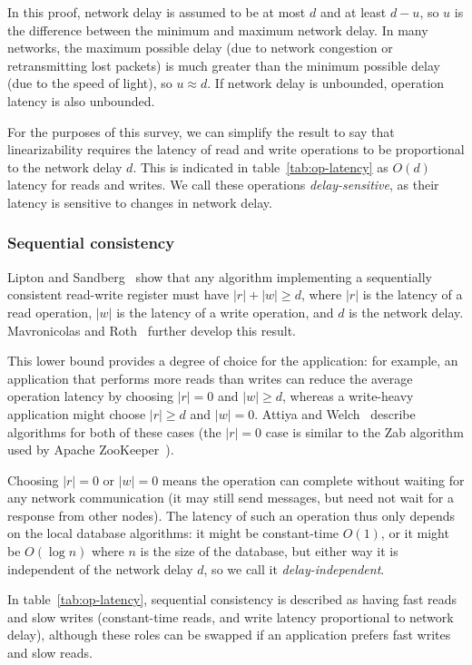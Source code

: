 \documentclass[a4paper,twocolumn,10pt]{article}
\begin{document}
In this proof, network delay is assumed to be at most $d$ and at least $d-u$, so $u$ is the
difference between the minimum and maximum network delay. In many networks, the maximum possible
delay (due to network congestion or retransmitting lost packets) is much greater than the minimum
possible delay (due to the speed of light), so $u \approx d$. If network delay is unbounded,
operation latency is also unbounded.

For the purposes of this survey, we can simplify the result to say that linearizability requires the
latency of read and write operations to be proportional to the network delay $d$. This is indicated
in table~\ref{tab:op-latency} as $O(d)$ latency for reads and writes. We call these operations
\emph{delay-sensitive}, as their latency is sensitive to changes in network delay.

\subsubsection{Sequential consistency}

Lipton and Sandberg~\cite{Lipton1988uh} show that any algorithm implementing a sequentially
consistent read-write register must have $|r| + |w| \geq d$, where $|r|$ is the latency of a read
operation, $|w|$ is the latency of a write operation, and $d$ is the network delay. Mavronicolas
and Roth~\cite{Mavronicolas1999eb} further develop this result.

This lower bound provides a degree of choice for the application: for example, an application that
performs more reads than writes can reduce the average operation latency by choosing $|r| = 0$ and
$|w| \geq d$, whereas a write-heavy application might choose $|r| \geq d$ and $|w| = 0$. Attiya and
Welch~\cite{Attiya1994gw} describe algorithms for both of these cases (the $|r| = 0$ case is similar
to the Zab algorithm used by Apache ZooKeeper~\cite{Junqueira2011jc}).

Choosing $|r| = 0$ or $|w| = 0$ means the operation can complete without waiting for any network
communication (it may still send messages, but need not wait for a response from other nodes). The
latency of such an operation thus only depends on the local database algorithms: it might be
constant-time $O(1)$, or it might be $O(\log n)$ where $n$ is the size of the database, but either
way it is independent of the network delay $d$, so we call it \emph{delay-independent}.

In table~\ref{tab:op-latency}, sequential consistency is described as having fast reads and slow
writes (constant-time reads, and write latency proportional to network delay), although these roles
can be swapped if an application prefers fast writes and slow reads.
\end{document}

